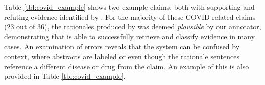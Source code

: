 Table \ref{tbl:covid_example} shows two example claims, both with supporting and refuting evidence identified by \sysname. For the majority of these COVID-related claims (23 out of 36), the rationales produced by \sysname was deemed \emph{plausible} by our annotator, demonstrating that \sysname is able to successfully retrieve and classify evidence in many cases. An examination of errors reveals that the system can be confused by context, where abstracts are labeled \supports or  even though the rationale sentences reference a different disease or drug from the claim. An example of this is also provided in Table \ref{tbl:covid_example}.


